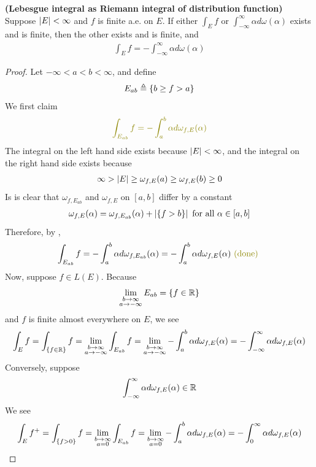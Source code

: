 \documentclass{report}
\begin{document}
\begin{theorem}
\textbf{(Lebesgue integral as Riemann integral of distribution function)} Suppose $\left|E\right|<\infty$ and $f$ is finite a.e. on $E$. If either $\int_E f$ or $\int_{-\infty}^{\infty}\alpha d\omega (\alpha )$ exists and is finite, then the other exists and is finite, and 
\begin{align*}
\int_E f= - \int_{-\infty}^{\infty} \alpha d \omega (\alpha )
\end{align*}
\end{theorem}
\begin{proof}
Let $-\infty < a< b<\infty$, and define 
\begin{align*}
E_{ab}\triangleq \{ b\geq  f>a \}
\end{align*}
We first claim 
\begin{align*}
\olive{\int_{E_{ab}}f= - \int_a^b \alpha d\omega_{f,E} (\alpha ) }
\end{align*}
The integral on the left hand side exists because $\left|E\right|< \infty$, and the integral on the right hand side exists because 
\begin{align*}
\infty> \left|E\right|\geq \omega_{f,E}(a)\geq \omega_{f,E}(b) \geq 0
\end{align*}
Is is clear that $\omega_{f,E_{ab}}$ and $\omega_{f,E}$ on $[a,b]$ differ by a constant 
\begin{align*}
\omega_{f,E} (\alpha )= \omega_{f,E_{ab}} (\alpha )+  \left|\{ f>b \}\right|\text{ for all }\alpha  \in [a,b]
\end{align*}
Therefore, by , 
\begin{align*}
\int_{E_{ab}}f= - \int_a^b \alpha d\omega_{f,E_{ab}}(\alpha )= - \int_a^b \alpha d \omega_{f,E}(\alpha ) \odone 
\end{align*}
Now, suppose $f \in L(E)$. Because 
\begin{align*}
\lim_{\substack{b \to \infty \\ a \to -\infty}}E_{ab}= \{ f \in\mathbb{R} \}
\end{align*}
and $f$ is finite almost everywhere on $E$, we see 
 \begin{align*}
\int_E f= \int_{ \{ f\in\mathbb{R}  \}} f=  \lim_{\substack{b \to \infty \\ a \to -\infty}} \int_{E_{ab}}f=  \lim_{\substack{b \to \infty \\ a \to -\infty}} - \int_a^b \alpha d \omega_{f,E}(\alpha )= - \int_{-\infty} ^{\infty} \alpha d \omega_{f,E}(\alpha )
\end{align*}
Conversely, suppose 
\begin{align*}
\int_{-\infty}^{ \infty} \alpha d \omega_{f,E}(\alpha )\in\mathbb{R}
\end{align*}
We see 
\begin{align*}
  \int_E f^+ =\int_{\{ f>0 \}} f=   \lim_{\substack{b \to \infty \\ a=0}}\int_{E_{ab}} f =  \lim_{\substack{b \to \infty \\ a=0}} - \int_a^b \alpha d\omega_{f,E}(\alpha )= - \int_0^{\infty} \alpha d\omega_{f,E}(\alpha )
\end{align*}

\end{proof}
\end{document}
